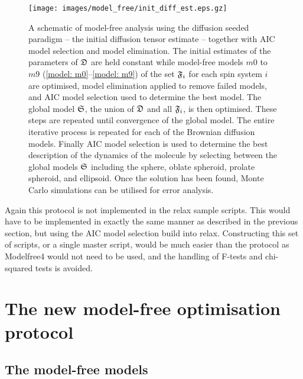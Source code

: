 \begin{htmlonly}
\begin{htmlonly}
\begin{figure}
\centerline{\texttt{[image: images/model\_free/init\_diff\_est.eps.gz]}}
\caption[Model-free analysis using the diffusion seeded paradigm]{A schematic of model-free analysis using the diffusion seeded paradigm -- the initial diffusion tensor estimate -- together with AIC model selection and model elimination.  The initial estimates of the parameters of $\mathfrak{D}$ are held constant while model-free models $m0$ to $m9$ (\ref{model: m0}--\ref{model: m9}) of the set $\mathfrak{F}_i$ for each spin system $i$ are optimised, model elimination applied to remove failed models, and AIC model selection used to determine the best model.  The global model $\mathfrak{S}$, the union of $\mathfrak{D}$ and all $\mathfrak{F}_i$, is then optimised.  These steps are repeated until convergence of the global model.  The entire iterative process is repeated for each of the Brownian diffusion models.  Finally AIC model selection is used to determine the best description of the dynamics of the molecule by selecting between the global models $\mathfrak{S}$ including the sphere, oblate spheroid, prolate spheroid, and ellipsoid.  Once the solution has been found, Monte Carlo simulations can be utilised for error analysis.} \label{fig: init diff estimate}
\end{figure}

Again this protocol is not implemented in the relax sample scripts.  This would have to be implemented in exactly the same manner as described in the previous section, but using the AIC model selection build into relax.  Constructing this set of scripts, or a single master script, would be much easier than the \citet{Mandel95} protocol as Modelfree4 would not need to be used, and the handling of F-tests and chi-squared tests is avoided.



\section{The new model-free optimisation protocol}
\label{sect: new model-free protocol}


\subsection{The model-free models}


\end{htmlonly}
\end{htmlonly}
